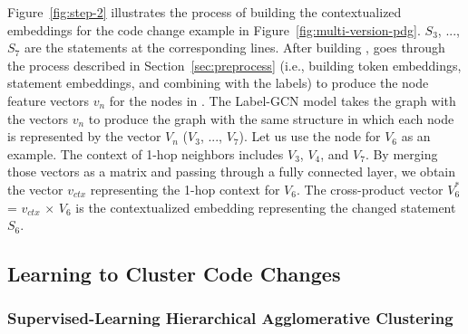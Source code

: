 Figure~\ref{fig:step-2} illustrates the process of building the
contextualized embeddings for the code change example in
Figure~\ref{fig:multi-version-pdg}. $S_3$, ..., $S_7$ are the
statements at the corresponding lines. After building {\mvpdg},
{\tool} goes through the process described in
Section~\ref{sec:preprocess} (i.e., building token embeddings,
statement embeddings, and combining with the labels) to produce the
node feature vectors $v_n$ for the nodes in {\mvpdg}. The Label-GCN model
takes the graph with the vectors $v_n$ to produce the graph with the
same structure in which each node is represented by the vector $V_n$
($V_3$, ..., $V_7$). Let us use the node for $V_6$ as an example.  The
context of 1-hop neighbors includes $V_3$, $V_4$, and $V_7$. By
merging those vectors as a matrix and passing through a fully
connected layer, we obtain the vector $v_{ctx}$ representing the 1-hop
context for $V_6$. The cross-product vector  $V^{*}_6$ = $v_{ctx}$ $\times$ $V_6$
is the contextualized embedding representing the changed statement
$S_6$.





\subsection{Learning to Cluster Code Changes}
\label{clustering:sec}

\subsubsection{\bf Supervised-Learning Hierarchical Agglomerative Clustering}

